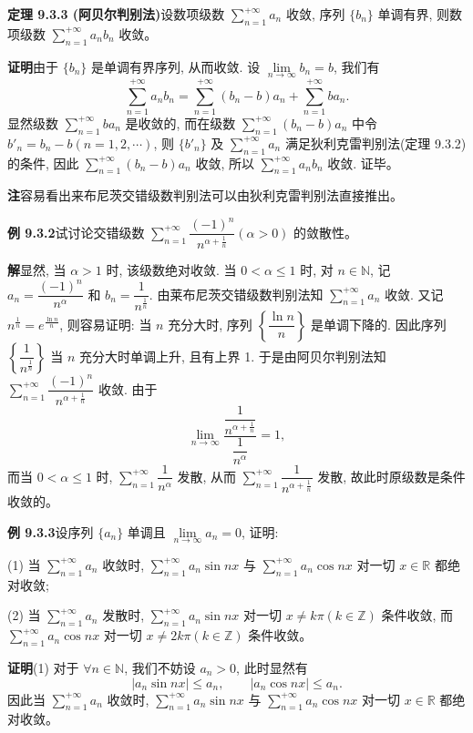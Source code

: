 \documentclass[UTF8,12pt,a4paper,fontset=fandol]{ctexart}
\begin{document}
\noindent\textbf{定理 9.3.3 (阿贝尔判别法)}\quad 设数项级数 $\sum\limits_{n=1}^{+\infty}a_n$ 收敛, 序列 $\{b_n\}$ 单调有界, 则数项级数 $\sum\limits_{n=1}^{+\infty}a_nb_n$ 收敛。

\noindent\textbf{证明}\quad 由于 $\{b_n\}$ 是单调有界序列, 从而收敛. 设 $\lim\limits_{n\to\infty}b_n=b$, 我们有
\[
  \sum_{n=1}^{+\infty}a_nb_n
  =\sum_{n=1}^{+\infty}(b_n-b)a_n+\sum_{n=1}^{+\infty}ba_n.
\]
显然级数 $\sum\limits_{n=1}^{+\infty}ba_n$ 是收敛的, 而在级数 $\sum\limits_{n=1}^{+\infty}(b_n-b)a_n$ 中令 $b'_n=b_n-b(n=1,2,\cdots)$, 则 $\{b'_n\}$ 及 $\sum\limits_{n=1}^{+\infty}a_n$ 满足狄利克雷判别法(定理 9.3.2)的条件, 因此 $\sum\limits_{n=1}^{+\infty}(b_n-b)a_n$ 收敛, 所以 $\sum\limits_{n=1}^{+\infty}a_nb_n$ 收敛. 证毕。

\noindent\textbf{注}\quad 容易看出来布尼茨交错级数判别法可以由狄利克雷判别法直接推出。

\noindent\textbf{例 9.3.2}\quad 试讨论交错级数 $\sum\limits_{n=1}^{+\infty}\dfrac{(-1)^n}{n^{\alpha+\frac1n}}(\alpha>0)$ 的敛散性。

\noindent\textbf{解}\quad 显然, 当 $\alpha>1$ 时, 该级数绝对收敛. 当 $0<\alpha\leq1$ 时, 对 $n\in\mathbb{N}$, 记 $a_n=\dfrac{(-1)^n}{n^\alpha}$ 和 $b_n=\dfrac1{n^{\frac1n}}$. 由莱布尼茨交错级数判别法知 $\sum\limits_{n=1}^{+\infty}a_n$ 收敛. 又记 $n^{\frac1n}=e^{\frac{\ln n}{n}}$, 则容易证明: 当 $n$ 充分大时, 序列 $\left\{\dfrac{\ln n}{n}\right\}$ 是单调下降的. 因此序列 $\left\{\dfrac1{n^{\frac1n}}\right\}$ 当 $n$ 充分大时单调上升, 且有上界 1. 于是由阿贝尔判别法知 $\sum\limits_{n=1}^{+\infty}\dfrac{(-1)^n}{n^{\alpha+\frac1n}}$ 收敛. 由于
\[
  \lim_{n\to\infty}\frac{\dfrac1{n^{\alpha+\frac1n}}}{\dfrac1{n^\alpha}}=1,
\]
而当 $0<\alpha\leq1$ 时, $\sum\limits_{n=1}^{+\infty}\dfrac1{n^\alpha}$ 发散, 从而 $\sum\limits_{n=1}^{+\infty}\dfrac1{n^{\alpha+\frac1n}}$ 发散, 故此时原级数是条件收敛的。

\noindent\textbf{例 9.3.3}\quad 设序列 $\{a_n\}$ 单调且 $\lim\limits_{n\to\infty}a_n=0$, 证明:

(1) 当 $\sum\limits_{n=1}^{+\infty}a_n$ 收敛时, $\sum\limits_{n=1}^{+\infty}a_n\sin nx$ 与 $\sum\limits_{n=1}^{+\infty}a_n\cos nx$ 对一切 $x\in\mathbb{R}$ 都绝对收敛;

(2) 当 $\sum\limits_{n=1}^{+\infty}a_n$ 发散时, $\sum\limits_{n=1}^{+\infty}a_n\sin nx$ 对一切 $x\neq k\pi(k\in\mathbb{Z})$ 条件收敛, 而 $\sum\limits_{n=1}^{+\infty}a_n\cos nx$ 对一切 $x\neq2k\pi(k\in\mathbb{Z})$ 条件收敛。

\noindent\textbf{证明}\quad (1) 对于 $\forall n\in\mathbb{N}$, 我们不妨设 $a_n>0$, 此时显然有
\[
  |a_n\sin nx|\leq a_n,\qquad |a_n\cos nx|\leq a_n.
\]
因此当 $\sum\limits_{n=1}^{+\infty}a_n$ 收敛时, $\sum\limits_{n=1}^{+\infty}a_n\sin nx$ 与 $\sum\limits_{n=1}^{+\infty}a_n\cos nx$ 对一切 $x\in\mathbb{R}$ 都绝对收敛。
\end{document}
